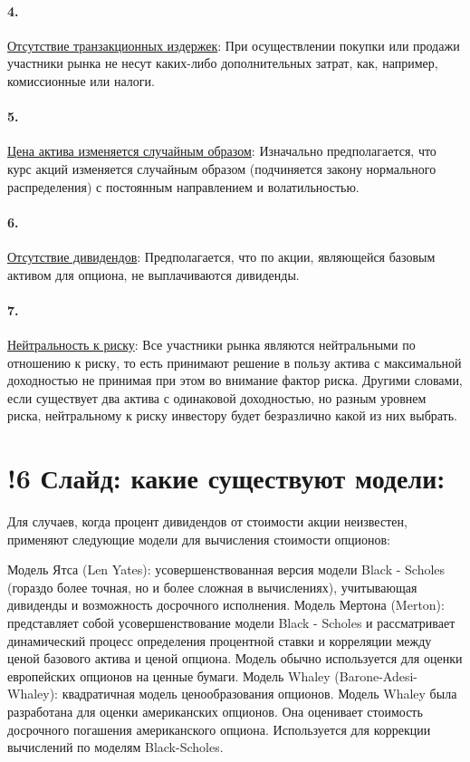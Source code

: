 \documentclass[a4paper]{article}
\begin{document}
\paragraph*{4.} \underline{Отсутствие транзакционных издержек}: При осуществлении покупки или продажи участники рынка не несут каких-либо дополнительных затрат, как, например, комиссионные или налоги.
\paragraph*{5.} \underline{Цена актива изменяется случайным образом}: Изначально предполагается, что курс акций изменяется случайным образом (подчиняется закону нормального распределения) с постоянным направлением и волатильностью.
\paragraph*{6.} \underline{Отсутствие дивидендов}: Предполагается, что по акции, являющейся базовым активом для опциона, не выплачиваются дивиденды.

\paragraph*{7.} \underline{Нейтральность к риску}: Все участники рынка являются нейтральными по отношению к риску, то есть принимают решение в пользу актива с максимальной доходностью не принимая при этом во внимание фактор риска. Другими словами, если существует два актива с одинаковой доходностью, но разным уровнем риска, нейтральному к риску инвестору будет безразлично какой из них выбрать.

\section*{!6 Слайд: какие существуют модели:}
Для случаев, когда процент дивидендов от стоимости акции неизвестен, применяют следующие модели для вычисления стоимости опционов:

Модель Ятса (Len Yates): усовершенствованная версия модели Black - Scholes (гораздо более точная, но и более сложная в вычислениях), учитывающая дивиденды и возможность досрочного исполнения.
Модель Мертона (Merton): представляет собой усовершенствование модели Black - Scholes и рассматривает динамический процесс определения процентной ставки и корреляции между ценой базового актива и ценой опциона. Модель обычно используется для оценки европейских опционов на ценные бумаги.
Модель Whaley (Barone-Adesi-Whaley): квадратичная модель ценообразования опционов. Модель Whaley была разработана для оценки американских опционов. Она оценивает стоимость досрочного погашения американского опциона. Используется для коррекции вычислений по моделям Black-Scholes.
\end{document}
